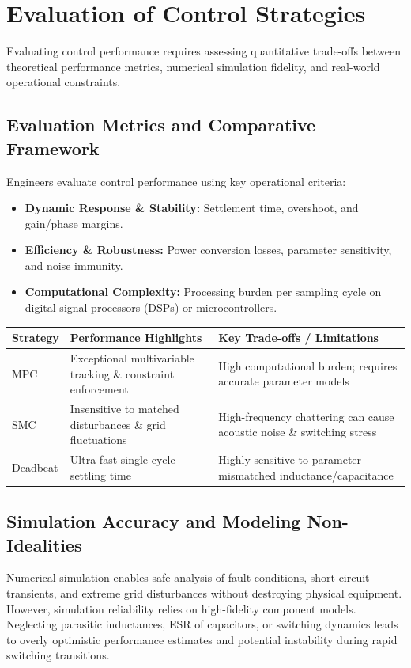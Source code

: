 \documentclass[12pt,a4paper]{article}
\begin{document}
\section{Evaluation of Control Strategies}

Evaluating control performance requires assessing quantitative trade-offs between theoretical performance metrics, numerical simulation fidelity, and real-world operational constraints.

\subsection{Evaluation Metrics and Comparative Framework}
Engineers evaluate control performance using key operational criteria:
\begin{itemize}
    \item \textbf{Dynamic Response \& Stability:} Settlement time, overshoot, and gain/phase margins.
    \item \textbf{Efficiency \& Robustness:} Power conversion losses, parameter sensitivity, and noise immunity.
    \item \textbf{Computational Complexity:} Processing burden per sampling cycle on digital signal processors (DSPs) or microcontrollers.
\end{itemize}

\begin{center}
\renewcommand{\arraystretch}{1.4}
\begin{tabularx}{\textwidth}{|>{\raggedright\arraybackslash}p{2.8cm}|X|>{\raggedright\arraybackslash}X|}
\hline
\textbf{Strategy} & \textbf{Performance Highlights} & \textbf{Key Trade-offs / Limitations} \\
\hline
MPC & Exceptional multivariable tracking \& constraint enforcement & High computational burden; requires accurate parameter models \\
\hline
SMC & Insensitive to matched disturbances \& grid fluctuations & High-frequency chattering can cause acoustic noise \& switching stress \\
\hline
Deadbeat & Ultra-fast single-cycle settling time & Highly sensitive to parameter mismatched inductance/capacitance \\
\hline
\end{tabularx}
\end{center}

\subsection{Simulation Accuracy and Modeling Non-Idealities}
Numerical simulation enables safe analysis of fault conditions, short-circuit transients, and extreme grid disturbances without destroying physical equipment. However, simulation reliability relies on high-fidelity component models. Neglecting parasitic inductances, ESR of capacitors, or switching dynamics leads to overly optimistic performance estimates and potential instability during rapid switching transitions.
\end{document}
